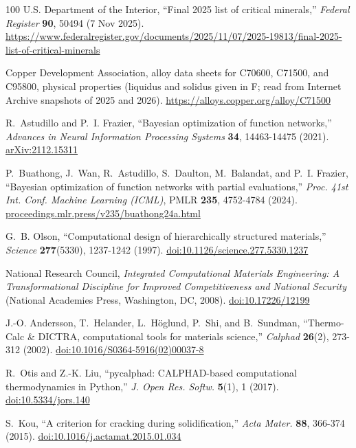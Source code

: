 \documentclass[12pt,letterpaper]{article}
\begin{document}
\begin{thebibliography}{100}
U.S. Department of the Interior, ``Final 2025 list of critical minerals,'' \emph{Federal Register} \textbf{90}, 50494 (7 Nov 2025).
\url{https://www.federalregister.gov/documents/2025/11/07/2025-19813/final-2025-list-of-critical-minerals}

Copper Development Association, alloy data sheets for C70600, C71500, and C95800, physical properties (liquidus and solidus given in \textdegree{}F; read from Internet Archive snapshots of 2025 and 2026).
\url{https://alloys.copper.org/alloy/C71500}

R.~Astudillo and P.~I. Frazier, ``Bayesian optimization of function
networks,'' \emph{Advances in Neural Information Processing Systems}
\textbf{34}, 14463-14475 (2021).
\href{https://arxiv.org/abs/2112.15311}{arXiv:2112.15311}

P.~Buathong, J.~Wan, R.~Astudillo, S.~Daulton, M.~Balandat, and P.~I.
Frazier, ``Bayesian optimization of function networks with partial
evaluations,'' \emph{Proc. 41st Int. Conf. Machine Learning (ICML)}, PMLR
\textbf{235}, 4752-4784 (2024).
\href{https://proceedings.mlr.press/v235/buathong24a.html}{proceedings.mlr.press/v235/buathong24a.html}

G.~B. Olson, ``Computational design of hierarchically structured materials,'' \emph{Science} \textbf{277}(5330), 1237-1242 (1997).
\href{https://doi.org/10.1126/science.277.5330.1237}{doi:10.1126/science.277.5330.1237}

National Research Council, \emph{Integrated Computational Materials Engineering: A Transformational Discipline for Improved Competitiveness and National Security} (National Academies Press, Washington, DC, 2008).
\href{https://doi.org/10.17226/12199}{doi:10.17226/12199}

J.-O. Andersson, T.~Helander, L.~H{\"o}glund, P.~Shi, and B.~Sundman,
``Thermo-Calc \& DICTRA, computational tools for materials science,''
\emph{Calphad} \textbf{26}(2), 273-312 (2002).
\href{https://doi.org/10.1016/S0364-5916(02)00037-8}{doi:10.1016/S0364-5916(02)00037-8}

R.~Otis and Z.-K. Liu, ``pycalphad: CALPHAD-based computational
thermodynamics in Python,'' \emph{J. Open Res. Softw.} \textbf{5}(1), 1
(2017). \href{https://doi.org/10.5334/jors.140}{doi:10.5334/jors.140}

S.~Kou, ``A criterion for cracking during solidification,''
\emph{Acta Mater.} \textbf{88}, 366-374 (2015).
\href{https://doi.org/10.1016/j.actamat.2015.01.034}{doi:10.1016/j.actamat.2015.01.034}


\end{thebibliography}
\end{document}

